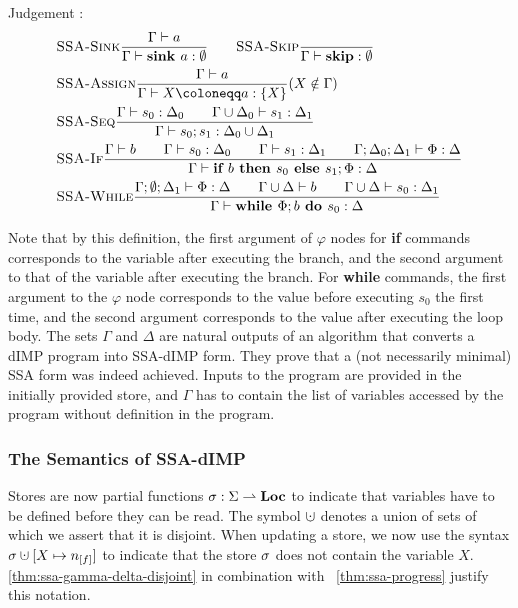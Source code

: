 Judgement :
\begin{align*}
    &\trule{SSA-Sink}{\typestmt{\Gamma}{a}}{\typestep{\Gamma}{\sink{a}}{\emptyset}}\qquad
    \trule{SSA-Skip}{}{\typestep{\Gamma}{\skipcmd}{\emptyset}}\\
    &\trule{SSA-Assign}{\typestmt{\Gamma}{a}}{\typestep{\Gamma}{\defaultstore}{\{X\}}} \text{($X \notin \Gamma$)}\\
    &\trule{SSA-Seq}{\typestep{\Gamma}{s_0}{\Delta_0}\qquad
    \typestep{\Gamma \cup \Delta_0}{s_1}{\Delta_1}}{\typestep{\Gamma}{\defaultssaseq}{\Delta_0 \cup \Delta_1}}\\
    &\trule{SSA-If}{\typestmt{\Gamma}{b}\qquad\typestep{\Gamma}{s_0}{\Delta_0}\qquad \typestep{\Gamma}{s_1}{\Delta_1}\qquad
    \typestep{\Gamma;\Delta_0;\Delta_1}{\philist}{\Delta}}
    {\typestep{\Gamma}{\defaultssaif}{\Delta}}\\
    &\trule{SSA-While}{\typestep{\Gamma;\emptyset;\Delta_1}{\philist}{\Delta}\qquad
    \typestmt{\Gamma \cup \Delta}{b}\qquad\typestep{\Gamma \cup \Delta}{s_0}{\Delta_1}}
    {\typestep{\Gamma}{\defaultssawhile}{\Delta}}
\end{align*}

Note that by this definition, the first argument of $\varphi$ nodes for \textbf{if} commands
corresponds to the variable after executing the \btrue{} branch, and the second argument to that
of the variable after executing the \bfalse{} branch.
For \textbf{while} commands, the first argument to the $\varphi$ node corresponds to the value
before executing $s_0$ the first time, and the second argument corresponds to the value 
after executing the loop body.
The sets $\Gamma$ and $\Delta$ are natural outputs of an algorithm that converts a 
dIMP program into SSA-dIMP form.
They prove that a (not necessarily minimal) SSA form was indeed achieved.
Inputs to the program are provided in the initially provided store, and $\Gamma$
has to contain the list of variables accessed by the program without definition in the program.

\subsubsection*{The Semantics of SSA-dIMP}
Stores are now partial functions $\sigma : \Sigma \rightharpoonup \textbf{Loc}$ to indicate that
variables have to be defined before they can be read.
The symbol $\dunion$ denotes a union of sets of which we assert that it is disjoint.
When updating a store, we now use the syntax 
$\store \dunion [X \mapsto \flagged{}]$ to indicate that the store $\sigma$ does not
contain the variable $X$.
\autoref{thm:ssa-gamma-delta-disjoint} in combination with ~\autoref{thm:ssa-progress}
justify this notation.

